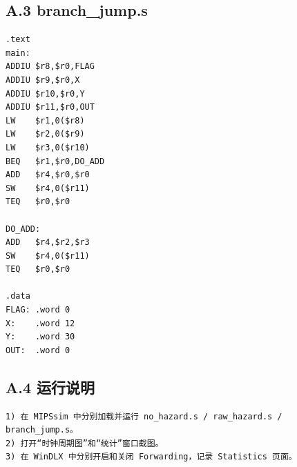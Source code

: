 \documentclass[12pt,a4paper]{ctexart}
\begin{document}
\subsection*{A.3 branch\_jump.s}
\begin{lstlisting}
.text
main:
ADDIU $r8,$r0,FLAG
ADDIU $r9,$r0,X
ADDIU $r10,$r0,Y
ADDIU $r11,$r0,OUT
LW    $r1,0($r8)
LW    $r2,0($r9)
LW    $r3,0($r10)
BEQ   $r1,$r0,DO_ADD
ADD   $r4,$r0,$r0
SW    $r4,0($r11)
TEQ   $r0,$r0

DO_ADD:
ADD   $r4,$r2,$r3
SW    $r4,0($r11)
TEQ   $r0,$r0

.data
FLAG: .word 0
X:    .word 12
Y:    .word 30
OUT:  .word 0
\end{lstlisting}

\subsection*{A.4 运行说明}
\begin{verbatim}
1) 在 MIPSsim 中分别加载并运行 no_hazard.s / raw_hazard.s / branch_jump.s。
2) 打开“时钟周期图”和“统计”窗口截图。
3) 在 WinDLX 中分别开启和关闭 Forwarding，记录 Statistics 页面。
\end{verbatim}
\end{document}
